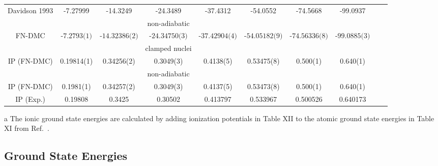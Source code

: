 \documentclass[pra,superscriptaddress,groupedaddress,twocolumn]{revtex4}
\begin{document}
\begin{table}[t!]
\begin{threeparttable}
\begin{tabular*}{\textwidth}{@{\extracolsep{\fill}} cccccccccc}
Davidson 1993\tnote{a} \cite{Davidson_Atoms} & -7.27999 & -14.3249 & -24.3489 & -37.4312 & -54.0552 & -74.5668 & -99.0937 \\
&&&non-adiabatic&&&& \\
FN-DMC & $\text{-7.2793(1)}$ & $\text{-14.32386(2)}$ & $\text{-24.34750(3)}$ & $\text{-37.42904(4)}$ & $\text{-54.05182(9)}$ & $\text{-74.56336(8)}$ & $\text{-99.0885(3)}$ \\
\hline
&&&clamped nuclei&&&& \\
IP (FN-DMC) & 0.19814(1) & 0.34256(2) & 0.3049(3) & 0.4138(5) & 0.53475(8) & 0.500(1) & 0.640(1) \\
&&&non-adiabatic&&&& \\
IP (FN-DMC) & 0.1981(1) & 0.34257(2) & 0.3049(3) & 0.4137(5) & 0.53473(8) & 0.500(1) & 0.640(1) \\
IP (Exp.) \cite{Davidson_Atoms} & 0.19808 & 0.3425 & 0.30502 & 0.413797 & 0.533967 & 0.500526 & 0.640173 \\
\hline\hline
\end{tabular*}
\begin{tablenotes}
\item[a] The ionic ground state energies are calculated by adding ionization potentials in Table XII to the atomic ground state energies in Table XI from Ref.~\cite{Davidson_Atoms}.
\end{tablenotes}
\end{threeparttable}
\end{table}

\subsection{Ground State Energies}
\end{document}
